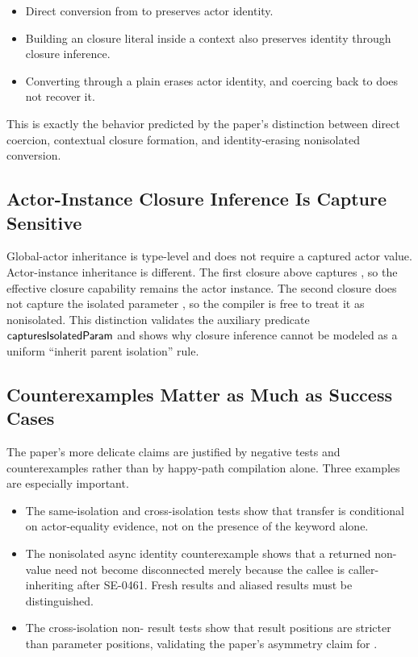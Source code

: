 \begin{itemize}
  \item Direct conversion from  to  preserves actor identity.
  \item Building an  closure literal inside a  context also preserves identity through closure inference.
  \item Converting through a plain  erases actor identity, and coercing back to  does not recover it.
\end{itemize}

This is exactly the behavior predicted by the paper's distinction between direct coercion, contextual closure formation, and identity-erasing nonisolated conversion.

\subsection{Actor-Instance Closure Inference Is Capture Sensitive}


Global-actor inheritance is type-level and does not require a captured actor value. Actor-instance inheritance is different. The first closure above captures , so the effective closure capability remains the actor instance. The second closure does not capture the isolated parameter , so the compiler is free to treat it as nonisolated. This distinction validates the auxiliary predicate $\textsf{capturesIsolatedParam}$ and shows why closure inference cannot be modeled as a uniform ``inherit parent isolation'' rule.

\subsection{Counterexamples Matter as Much as Success Cases}

The paper's more delicate claims are justified by negative tests and counterexamples rather than by happy-path compilation alone. Three examples are especially important.

\begin{itemize}
  \item The same-isolation and cross-isolation  tests show that transfer is conditional on actor-equality evidence, not on the presence of the keyword alone.
  \item The nonisolated async identity counterexample shows that a returned non- value need not become disconnected merely because the callee is caller-inheriting after SE-0461. Fresh results and aliased results must be distinguished.
  \item The cross-isolation non- result tests show that result positions are stricter than parameter positions, validating the paper's asymmetry claim for .
\end{itemize}


